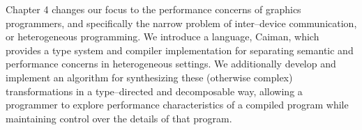 Chapter 4 changes our focus to the performance concerns of graphics programmers, and specifically the narrow problem of inter--device communication, or heterogeneous programming.  We introduce a language, Caiman, which provides a type system and compiler implementation for separating semantic and performance concerns in heterogeneous settings.  We additionally develop and implement an algorithm for synthesizing these (otherwise complex) transformations in a type--directed and decomposable way, allowing a programmer to explore performance characteristics of a compiled program while maintaining control over the details of that program.